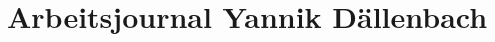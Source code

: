 \documentclass{scrartcl}
\begin{document}
	\section*{Arbeitsjournal Yannik Dällenbach}
\end{document}
